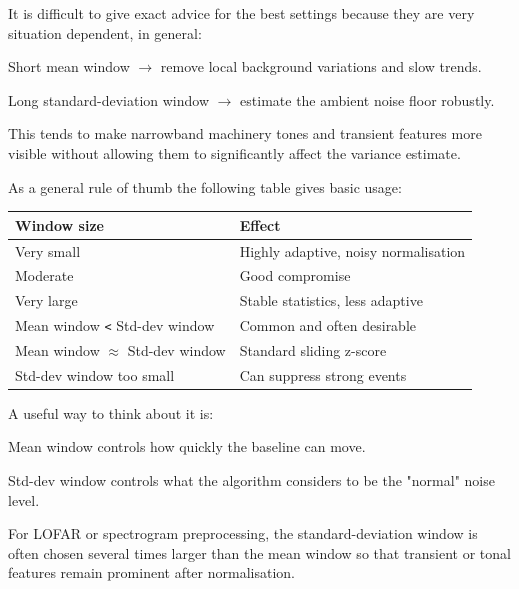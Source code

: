 It is difficult to give exact advice for the best settings because they are very situation dependent, in general:

\begin{compactenum}
    \item Short mean window $\rightarrow$ remove local background variations and slow trends.
	\item Long standard-deviation window $\rightarrow$ estimate the ambient noise floor robustly.
\end{compactenum}

This tends to make narrowband machinery tones and transient features more visible without allowing them to significantly affect the variance estimate.

As a general rule of thumb the following table gives basic usage:

\begin{tabularx}{\linewidth}{l X}
    \textbf{Window size} & \textbf{Effect} \\
    \hline
    \rowcolor[gray]{.8}Very small & Highly adaptive, noisy normalisation \\
    Moderate & Good compromise \\
    \rowcolor[gray]{.8}Very large & Stable statistics, less adaptive \\
    Mean window \verb|<| Std-dev window & Common and often desirable \\
    \rowcolor[gray]{.8}Mean window $\approx$ Std-dev window & Standard sliding z-score \\
    Std-dev window too small & Can suppress strong events \\
    \bottomrule
\end{tabularx}

A useful way to think about it is:
\begin{compactitem}
	\item Mean window controls how quickly the baseline can move.
	\item Std-dev window controls what the algorithm considers to be the "normal" noise level.
\end{compactitem}

For LOFAR or spectrogram preprocessing, the standard-deviation window is often chosen several times larger than the mean window so that transient or tonal features remain prominent after normalisation.

